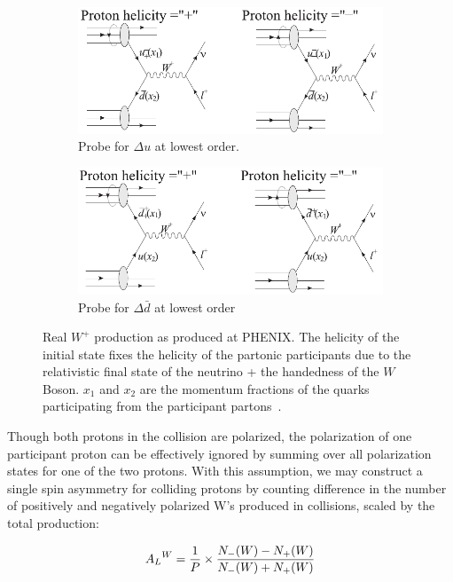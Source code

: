 \begin{figure}[ht]
  \centering
  \begin{subfigure}[b]{\textwidth}
    \centering
    \includegraphics[width=0.8\linewidth]{./figures/w_plus_u_probe.pdf}
    \caption{
      Probe for $\Delta u$ at lowest order.
    }
    \label{fig:u_probe}
  \end{subfigure}
  \begin{subfigure}[t]{\textwidth}
    \centering
    \includegraphics[width=0.8\linewidth]{./figures/w_plus_dbar_probe.pdf}
    \caption{
      Probe for $\Delta\bar{d}$ at lowest order
    }
    \label{fig:dbar_probe}
  \end{subfigure}
  \caption{
    Real $W^+$ production as produced at PHENIX. The helicity of the initial
    state fixes the helicity of the partonic participants due to the
    relativistic final state of the neutrino + the handedness of the $W$ Boson.
    $x_1$ and $x_2$ are the momentum fractions of the quarks participating from
    the participant partons~\cite{Aidala2005}. 
  }
  \label{fig:w_probe_leading_order}
\end{figure}

Though both protons in the collision are polarized, the polarization of one
participant proton can be effectively ignored by summing over all polarization
states for one of the two protons. With this assumption, we may construct a
single spin asymmetry for colliding protons by counting difference in the number
of positively and negatively polarized W's produced in collisions, scaled by the
total production:

\begin{equation}
  {{A_L}^W} =
  {{{1}\over{P}}\times{{N_{-}(W)-N_{+}(W)}\over{{N_{-}(W)+N_{+}(W)}}} }
  \label{eq:w_production_asymmetry}
\end{equation}

